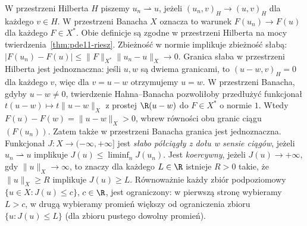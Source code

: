 \begin{definicja}
\label{def:pde11-weakconv}
W przestrzeni Hilberta $H$ piszemy $u_n\rightharpoonup u$,
jeżeli $(u_n,v)_H\to(u,v)_H$ dla każdego $v\in H$.
W przestrzeni Banacha $X$ oznacza to warunek
$F(u_n)\to F(u)$ dla każdego $F\in X^*$.
Obie definicje są zgodne w przestrzeni Hilberta
na mocy twierdzenia~\ref{thm:pde11-riesz}.
Zbieżność w normie implikuje zbieżność słabą:
$|F(u_n)-F(u)|\le\|F\|_{X^*}\|u_n-u\|_X\to0$.
Granica słaba w przestrzeni Hilberta jest jednoznaczna:
jeśli $u,w$ są dwiema granicami, to $(u-w,v)_H=0$
dla każdego $v$, więc dla $v=u-w$ otrzymujemy $u=w$.
W przestrzeni Banacha, gdyby $u-w\ne0$, twierdzenie
Hahna--Banacha pozwoliłoby przedłużyć funkcjonał
$t(u-w)\mapsto t\|u-w\|_X$ z prostej $\R(u-w)$
do $F\in X^*$ o normie $1$. Wtedy $F(u)-F(w)=\|u-w\|_X>0$,
wbrew równości obu granic ciągu $(F(u_n))$.
Zatem także w przestrzeni Banacha granica jest jednoznaczna.
Funkcjonał $J:X\to(-\infty,+\infty]$ jest
\emph{słabo półciągły z dołu w sensie ciągów}, jeżeli
$u_n\rightharpoonup u$ implikuje
$J(u)\le\liminf_n J(u_n)$.
Jest \emph{koercywny}, jeżeli $J(u)\to+\infty$,
gdy $\|u\|_X\to\infty$, to znaczy dla każdego $L\in\R$
istnieje $R>0$ takie, że $\|u\|_X\ge R$ implikuje $J(u)\ge L$.
Równoważnie każdy zbiór podpoziomowy
$\{u\in X:J(u)\le c\}$, $c\in\R$, jest ograniczony:
w pierwszą stronę wybieramy $L>c$, w drugą
wybieramy promień większy od ograniczenia zbioru
$\{u:J(u)\le L\}$ (dla zbioru pustego dowolny promień).
\end{definicja}

